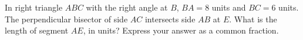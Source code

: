 In right triangle $ABC$ with the right angle at $B$, $BA=8$ units and $BC=6$ units. The perpendicular bisector of side $AC$ intersects side $AB$ at $E$. What is the length of segment $AE$, in units? Express your answer as a common fraction.
